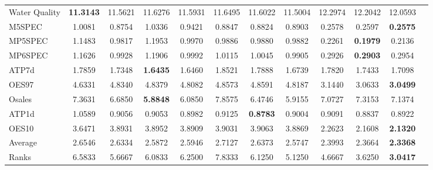 \documentclass[preprint,12pt]{elsarticle}
\begin{document}
{\begin{table*}[t!]
\begin{threeparttable}
{\begin{tabular}{lccccccccccc}
Water Quality &\textbf{11.3143} &11.5621 &11.6276 &11.5931 &11.6495 &11.6022 &11.5004 &12.2974 &12.2042 &12.0593 &  \\
M5SPEC &1.0081 &0.8754 &1.0336 &0.9421 &0.8847 &0.8824 &0.8903 &0.2578 &0.2597 &\textbf{0.2575} &  \\
MP5SPEC &1.1483 &0.9817 &1.1953 &0.9970 &0.9886 &0.9880 &0.9882 &0.2261 &\textbf{0.1979} &0.2136 &  \\
MP6SPEC &1.1626 &0.9928 &1.1906 &0.9992 &1.0115 &1.0045 &0.9905 &0.2926 &\textbf{0.2903} &0.2954 &  \\
ATP7d &1.7859 &1.7348 &\textbf{1.6435} &1.6460 &1.8521 &1.7888 &1.6739 &1.7820 &1.7433 &1.7098 &  \\
OES97 &4.6331 &4.8340 &4.8379 &4.8082 &4.8573 &4.8591 &4.8187 &3.1440 &3.0633 &\textbf{3.0499} &  \\
Osales &7.3631 &6.6850 &\textbf{5.8848} &6.0850 &7.8575 &6.4746 &5.9155 &7.0727 &7.3153 &7.1374 &  \\
ATP1d &1.0589 &0.9056 &0.9053 &0.8982 &0.9125 &\textbf{0.8783} &0.9004 &0.9091 &0.8837 &0.8922 &  \\
OES10 &3.6471 &3.8931 &3.8952 &3.8909 &3.9031 &3.9063 &3.8869 &2.2623 &2.1608 &\textbf{2.1320} &  \\
\hline
Average &2.6546 &2.6334 &2.5872 &2.5946 &2.7127 &2.6373 &2.5747 &2.3993 &2.3664 &\textbf{2.3368} &  \\
Ranks &6.5833 &5.6667 &6.0833 &6.2500 &7.8333 &6.1250 &5.1250 &4.6667 &3.6250 &\textbf{3.0417} &  \\
\bottomrule
\end{tabular}}
\end{threeparttable}
\label{tab:mseresults}
\end{table*}
\vspace{-2.5em}
\begin{figure}[h!]
\centering
\small
{}
\end{figure}}
\end{document}
